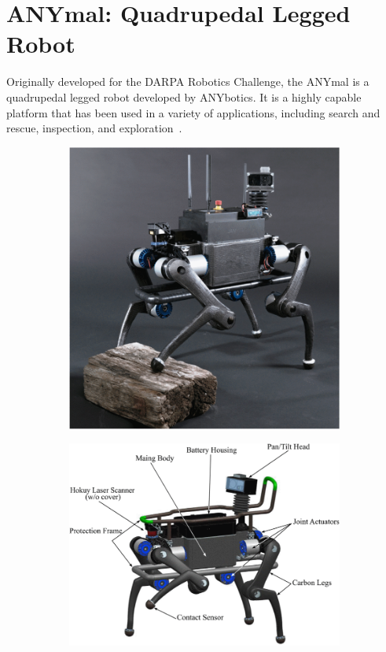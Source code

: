 \documentclass[12pt]{report}
\theoremstyle{definition}
\theoremstyle{remark}
\begin{document}
\section{ANYmal: Quadrupedal Legged Robot}\label{sec:anymal}
Originally developed for the DARPA Robotics Challenge, the ANYmal is a quadrupedal legged robot developed by ANYbotics. It is a highly capable platform that has been used in a variety of applications, including search and rescue, inspection, and exploration~\cite{hutter_anymal_2016, hutter_legged_2022}.
\begin{figure}[h]
    \begin{subfigure}[b]{0.4\linewidth}
        \centering
        \includegraphics[width=\linewidth]{figs/anymal.png}
    \end{subfigure}
    \hfill
    \begin{subfigure}[b]{0.55\linewidth}
        \centering
        \includegraphics[width=\linewidth]{figs/anymal_labeled.png}

\end{subfigure}
\end{figure}
\end{document}
